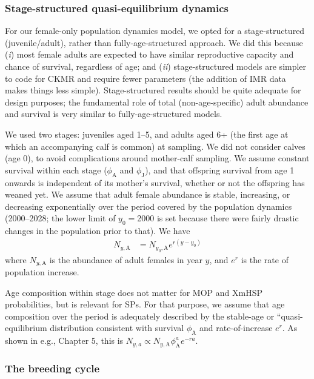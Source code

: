 \subsubsection{Stage-structured quasi-equilibrium dynamics}

For our female-only population dynamics model, we opted for a stage-structured
(juvenile/adult), rather than fully-age-structured approach. We did
this because (\textit{i}) most female adults are expected to have
similar reproductive capacity and chance of survival, regardless of
age; and (\textit{ii}) stage-structured models are simpler to code
for CKMR and require fewer parameters (the addition of IMR data makes
things less simple). Stage-structured results should be quite adequate
for design purposes; the fundamental role of total (non-age-specific)
adult abundance and survival is very similar to fully-age-structured
models.

We used two stages: juveniles aged 1–5, and adults aged 6+ (the first
age at which an accompanying calf is common) at sampling. We did not
consider calves (age 0), to avoid complications around mother-calf
sampling. We assume constant survival within each stage ($\phi_{\text{A}}$
and $\phi_{\text{J}}$), and that offspring survival from age 1 onwards
is independent of its mother's survival, whether or not the offspring
has weaned yet. We assume that adult female abundance is stable, increasing,
or decreasing exponentially over the period covered by the population
dynamics (2000–2028; the lower limit of $y_{0}=$2000 is set because
there were fairly drastic changes in the population prior to that).
We have
\begin{align}
N_{y,\text{A}} & =N_{y_{0},\text{A}}e^{r(y-y_{0})}\label{popdyn}
\end{align}
where $N_{y,\text{A}}$ is the abundance of adult females in year
$y$, and $e^{r}$ is the rate of population increase.

Age composition within stage does not matter for MOP and XmHSP probabilities,
but is relevant for SPs. For that purpose, we assume that age composition
over the period is adequately described by the stable-age or ``quasi-equilibrium\textquotedbl{}
distribution consistent with survival $\phi_{\text{A}}$ and rate-of-increase
$e^{r}$. As shown in e.g., \citet{keyfitz2005applied} Chapter 5,
this is  $N_{y,a}\propto N_{y,\text{A}}\phi_{\text{A}}^{a}e^{-ra}$.

\subsubsection{The breeding cycle\label{subsec:The-breeding-cycle}}

